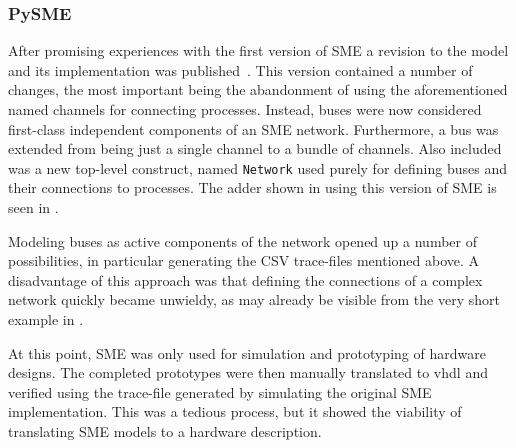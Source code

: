 \subsubsection{ PySME}
\label{sec:sme2}
After promising experiences with the first version of SME a revision to the
model and its implementation was published~\cite{vinter2015bus}. This version
contained a number of changes, the most important being the abandonment of using
the aforementioned named channels for connecting processes. Instead, buses were
now considered first-class independent components of an SME
network. Furthermore, a bus was extended from being just a single channel to a
bundle of channels. Also included was a new top-level construct, named
\texttt{Network} used purely for defining buses and their connections to
processes. The adder shown in  using this version of SME is seen
in .

Modeling buses as active components of the network opened up a number of
possibilities, in particular generating the CSV trace-files mentioned above. A
disadvantage of this approach was that defining the connections of a complex
network quickly became unwieldy, as may already be visible from the very short
example in .

At this point, SME was only used for simulation and prototyping of hardware
designs. The completed prototypes were then manually translated to \gls{vhdl}
and verified using the trace-file generated by simulating the original SME
implementation. This was a tedious process, but it showed the viability of
translating SME models to a hardware description.



